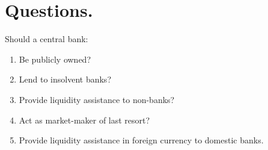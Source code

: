 \documentclass[20pt]{article}
\begin{document}
\section{Questions.}
Should a central bank:
\begin{enumerate}
    \item Be publicly owned? %
    \item Lend to insolvent banks?
    \item Provide liquidity assistance to non-banks?
    \item Act as market-maker of last resort?
    \item Provide liquidity assistance in foreign currency to domestic banks.
\end{enumerate}
\end{document}
